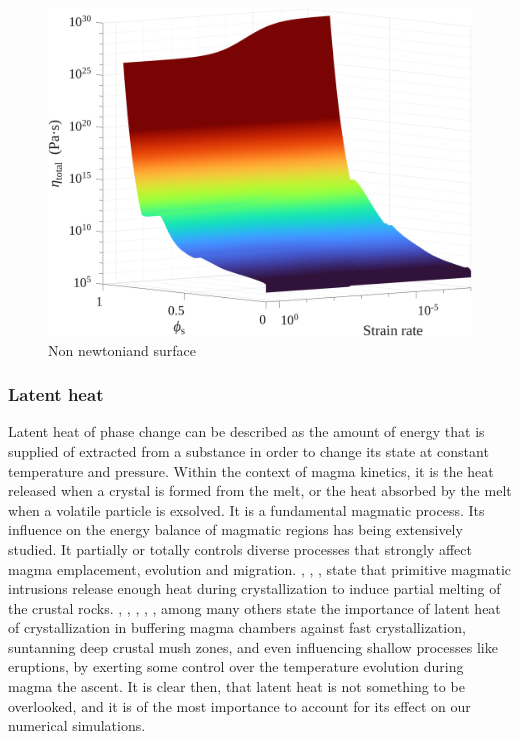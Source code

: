 \begin{figure}
	\centering
	\includegraphics[width=1\linewidth]{img/chapter2/properties/viscosity/non_newt_3D_phi.png}
	\caption{Non newtoniand surface}
	\label{fig:viscosity_3d}
\end{figure}

\subsubsection{Latent heat}
Latent heat of phase change can be described as the amount of energy that is supplied of extracted from a substance in order to change its state at constant temperature and pressure. Within the context of magma kinetics, it is the heat released when a crystal is formed from the melt, or the heat absorbed by the melt when a volatile particle is exsolved. It is a fundamental magmatic process. Its influence on the energy balance of magmatic regions has being extensively studied. It partially or totally controls diverse processes that strongly affect magma emplacement, evolution and migration. \cite{depaolo1981}, \cite{huppert1988}, \cite{spera2001}, \cite{tavazzani2024} state that primitive magmatic intrusions release enough heat during crystallization to induce partial melting of the crustal rocks. \cite{anne2005}, \cite{blundy2006}, \cite{dufek2010}, \cite{namur2014}, \cite{newcombe2020}, among many others state the importance of latent heat of crystallization in buffering magma chambers against fast crystallization, suntanning deep crustal mush zones, and even influencing shallow processes like eruptions, by exerting some control over the temperature evolution during magma the ascent. It is clear then, that latent heat is not something to be overlooked, and it is of the most importance to account for its effect on our numerical simulations. 


